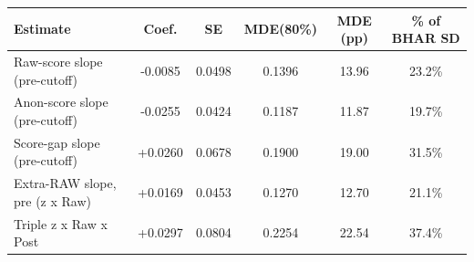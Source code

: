 \begin{tabular}{lccccc}
\toprule
Estimate & Coef. & SE & MDE(80\%) & MDE (pp) & \% of BHAR SD \\
\midrule
Raw-score slope (pre-cutoff) & -0.0085 & 0.0498 & 0.1396 & 13.96 & 23.2\% \\
Anon-score slope (pre-cutoff) & -0.0255 & 0.0424 & 0.1187 & 11.87 & 19.7\% \\
Score-gap slope (pre-cutoff) & +0.0260 & 0.0678 & 0.1900 & 19.00 & 31.5\% \\
Extra-RAW slope, pre (z x Raw) & +0.0169 & 0.0453 & 0.1270 & 12.70 & 21.1\% \\
Triple z x Raw x Post & +0.0297 & 0.0804 & 0.2254 & 22.54 & 37.4\% \\
\bottomrule
\end{tabular}
